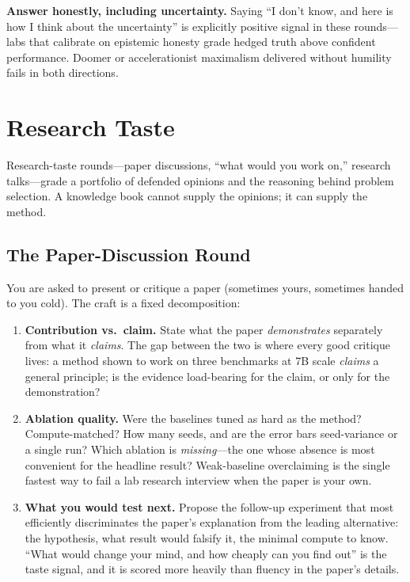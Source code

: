 \textbf{Answer honestly, including uncertainty.} Saying ``I don't know, and here is how I think about the uncertainty'' is explicitly positive signal in these rounds---labs that calibrate on epistemic honesty grade hedged truth above confident performance. Doomer or accelerationist maximalism delivered without humility fails in both directions.

\section{Research Taste}
\label{sec:research_taste}

Research-taste rounds---paper discussions, ``what would you work on,'' research talks---grade a portfolio of defended opinions and the reasoning behind problem selection. A knowledge book cannot supply the opinions; it can supply the method.

\subsection{The Paper-Discussion Round}

You are asked to present or critique a paper (sometimes yours, sometimes handed to you cold). The craft is a fixed decomposition:

\begin{enumerate}
    \item \textbf{Contribution vs.\ claim.} State what the paper \textit{demonstrates} separately from what it \textit{claims}. The gap between the two is where every good critique lives: a method shown to work on three benchmarks at 7B scale \textit{claims} a general principle; is the evidence load-bearing for the claim, or only for the demonstration?
    \item \textbf{Ablation quality.} Were the baselines tuned as hard as the method? Compute-matched? How many seeds, and are the error bars seed-variance or a single run? Which ablation is \textit{missing}---the one whose absence is most convenient for the headline result? Weak-baseline overclaiming is the single fastest way to fail a lab research interview when the paper is your own.
    \item \textbf{What you would test next.} Propose the follow-up experiment that most efficiently discriminates the paper's explanation from the leading alternative: the hypothesis, what result would falsify it, the minimal compute to know. ``What would change your mind, and how cheaply can you find out'' is the taste signal, and it is scored more heavily than fluency in the paper's details.
\end{enumerate}

